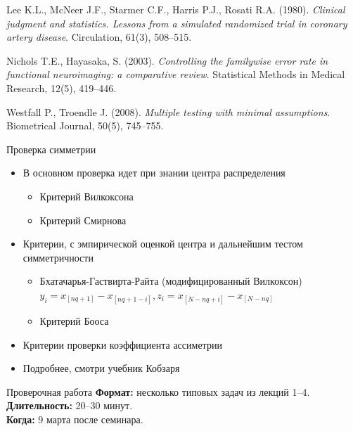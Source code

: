 \documentclass[9pt,pdf,utf8,hyperref={unicode},aspectratio=169]{beamer}
\begin{document}
\begin{frame}
{		\vspace{5pt}
			
	Lee K.L., McNeer J.F., Starmer C.F., Harris P.J., Rosati R.A. (1980). \textit{Clinical judgment and statistics. Lessons from a simulated randomized trial in coronary artery disease}. Circulation, 61(3), 508–515. 
		
		\vspace{5pt}
		    			    	
    Nichols T.E., Hayasaka, S. (2003). \textit{Controlling the familywise error rate in functional neuroimaging: a comparative review}. Statistical Methods in Medical Research, 12(5), 419–446.
		
		\vspace{5pt}
		    			    	
    Westfall P., Troendle J. (2008). \textit{Multiple testing with minimal assumptions}. Biometrical Journal, 50(5), 745–755.


	}
\end{frame}

\begin{frame}{Проверка симметрии}

\begin{itemize}
\item В основном проверка идет при знании центра распределения
\begin{itemize}
    \item Критерий Вилкоксона
    \item Критерий Смирнова
\end{itemize}
\item Критерии, с эмпирической оценкой центра и дальнейшим тестом симметричности
\begin{itemize}
    \item Бхатачарья-Гаствирта-Райта (модифицированный Вилкоксон)\\
    $y_i = x_{[nq + 1]} - x_{[nq + 1 - i]},  z_i = x_{[N - nq + i]} - x_{[N - nq]}$
    \item Критерий Бооса 
\end{itemize}
\item Критерии проверки коэффициента ассиметрии
\item Подробнее, смотри учебник Кобзаря
\end{itemize}
\end{frame}


\begin{frame}{Проверочная работа}
\textbf{Формат:} несколько типовых задач из лекций 1--4.\\

\textbf{Длительность:} 20--30 минут.\\

\textbf{Когда:} 9 марта после семинара.\end{frame}
\end{document}
